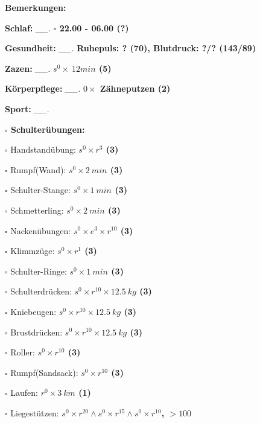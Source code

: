 \documentclass[10pt,a4paper]{article}
\newcommand\prop[1] {{\color {alizarin} {\bf #1}}}             %
\newcommand\mand[1] {{\color {burntorange} {\bf #1}}}          %
\newcommand\topspace{\vskip -15pt \hskip 20pt}
\newcommand\n[1] { {\sl #1.} \hskip 5pt }
\begin{document}
\begin{mdframed}[style=daystyle]
  \begin{labeling}{{\mand {Bemerkungen:}}}
    \setlength\itemsep{-3pt}
  \item[{\mand {Schlaf:}}]       \n{\_\_} {\prop {$\square$ 22.00 - 06.00 (?)}}
  \item[{\mand {Gesundheit:}}]   \n{\_\_} {\prop {Ruhepuls: ? (70), Blutdruck: ?/? (143/89)}}
  \item[{\mand {Zazen:}}]        \n{\_\_} {\prop {$s^0 \times\ 12 min$ (5)}}
  \item[{\mand {Körperpflege:}}] \n{\_\_} {\prop {$0 \times$ Zähneputzen (2)}}
  \item[{\mand {Sport:}}]        \n{\_\_}
    \topspace
    \begin{minipage}{0.75\textwidth}  
      \begin{labeling}{\prop {$\square$ {Schulterübungen:}}} 
        \setlength\itemsep{-3pt}
      \item[$\square$ Handstandübung:]  {\prop {$s^0 \times r^{3}$ (3)}}
      \item[$\square$ Rumpf(Wand):]     {\prop {$s^0 \times 2\ min$ (3)}}
      \item[$\square$ Schulter-Stange:] {\prop {$s^0 \times 1\ min$ (3)}}
      \item[$\square$ Schmetterling:]   {\prop {$s^0 \times 2\ min$ (3)}}
      \item[$\square$ Nackenübungen:]   {\prop {$s^0 \times e^3 \times r^{10}$ (3)}}
      \item[$\square$ Klimmzüge:]       {\prop {$s^0 \times r^1$ (3)}}
      \item[$\square$ Schulter-Ringe:]  {\prop {$s^0 \times 1\ min$ (3)}}
      \item[$\square$ Schulterdrücken:] {\prop {$s^0 \times r^{10} \times 12.5\ kg$ (3)}}
      \item[$\square$ Kniebeugen:]      {\prop {$s^0 \times r^{10} \times 12.5\ kg$ (3)}}
      \item[$\square$ Brustdrücken:]    {\prop {$s^0 \times r^{10} \times 12.5\ kg$ (3)}}
      \item[$\square$ Roller:]          {\prop {$s^0 \times r^{10}$ (3)}}
      \item[$\square$ Rumpf(Sandsack):] {\prop {$s^0 \times r^{10}$ (3)}}
      \item[$\square$ Laufen:]          {\prop {$r^0 \times 3\ km$ (1)}}
      \item[$\square$ Liegestützen:]    {\prop {$s^0 \times r^{20} \land s^0 \times r^{15} \land s^0 \times r^{10}$, $> 100$}}

\end{labeling}
\end{minipage}
\end{labeling}
\end{mdframed}
\end{document}
